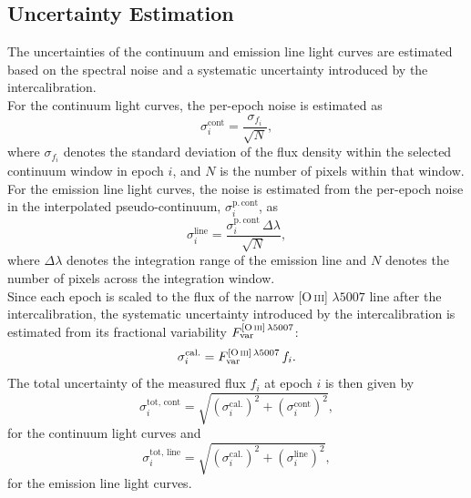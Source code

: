 \subsection{Uncertainty Estimation}
The uncertainties of the continuum and emission line light curves are estimated based on the spectral noise and a systematic uncertainty introduced by the intercalibration.\\
For the continuum light curves, the per-epoch noise is estimated as 
\begin{equation}
	\sigma_i^{\mathrm{cont}} = \frac{\sigma_{f_i}}{\sqrt{N}}, 
\end{equation} 
where $\sigma_{f_i}$ denotes the standard deviation of the flux density within the selected continuum window in epoch $i$, and $N$ is the number of pixels within that window. For the emission line light curves, the noise is estimated from the per-epoch noise in the interpolated pseudo-continuum, $\sigma_{i}^{\mathrm{p.\,cont}}$, as
\begin{equation}
	\sigma_{i}^{\mathrm{line}} = \frac{\sigma_{i}^{\mathrm{p.\,cont}} \, \Delta\lambda}{\sqrt{N}},
\end{equation}
where $\Delta\lambda$ denotes the integration range of the emission line and $N$ denotes the number of pixels across the integration window.\\
Since each epoch is scaled to the flux of the narrow [O\,\textsc{iii}] $\lambda5007$ line after the intercalibration, the systematic uncertainty introduced by the intercalibration is estimated from its fractional variability $F_{\mathrm{var}}^{\mathrm{[O\,\textsc{iii}]}\,\lambda5007}$:
\begin{equation}
	\sigma_i^{\mathrm{cal.}} = F_{\mathrm{var}}^{\mathrm{[O\,\textsc{iii}]}\,\lambda5007} \, f_i.
\end{equation}
The total uncertainty of the measured flux $f_i$ at epoch $i$ is then given by
\begin{equation}
	\sigma_i^\mathrm{tot,\,cont} = \sqrt{\left(\sigma_i^{\mathrm{cal.}}\right)^2 + \left(\sigma_i^{\mathrm{cont}}\right)^2},
\end{equation}
for the continuum light curves and 
\begin{equation}
	\sigma_i^\mathrm{tot,\,line} = \sqrt{\left(\sigma_i^{\mathrm{cal.}}\right)^2 + \left(\sigma_{i}^{\mathrm{line}}\right)^2},
\end{equation}
for the emission line light curves. 


